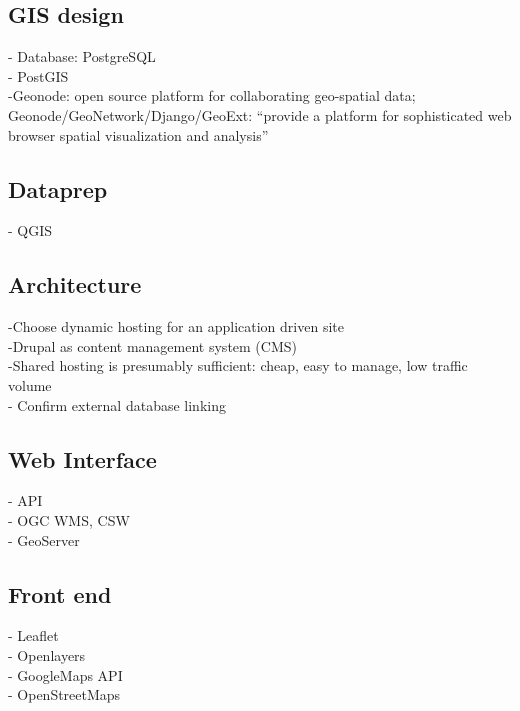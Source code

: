 \subsection{GIS design}
- Database: PostgreSQL \cite{Oliveira2021,Bhattacharya2018,Teitler2008,Sami2019}\\
- PostGIS \cite{Bhattacharya2018, Sami2019}\\
-{\color{orange}Geonode: open source platform for collaborating geo-spatial data; Geonode/GeoNetwork/Django/GeoExt: “provide a platform for sophisticated web browser spatial visualization and analysis”}\cite{Bhattacharya2018}\\

\subsection{Dataprep}
- QGIS \cite{Sami2019}\\

\subsection{Architecture}
-{\color{purple}Choose dynamic hosting for an application driven site\cite{Low2020}}\\
-{\color{purple}Drupal as content management system (CMS)\cite{Low2020}}\\
-{\color{purple}Shared hosting is presumably sufficient: cheap, easy to manage, low traffic volume\cite{Low2020}}\\
-{\color{purple} Confirm external database linking\cite{Low2020}}\\

\subsection{Web Interface}
- API\cite{Jiang2020}\\
- OGC WMS, CSW \cite{Bhattacharya2018,Jiang2020}\\
- GeoServer \cite{Bhattacharya2018,Jiang2020,Sami2019}\\

\subsection{Front end}
- Leaflet \cite{Sami2019, Fitoussi}\\
- Openlayers \cite{Bahattacharya2018, Sami2019}\\
- GoogleMaps API \cite{Fitoussi}\\
- OpenStreetMaps \cite{Fitoussi}\\

